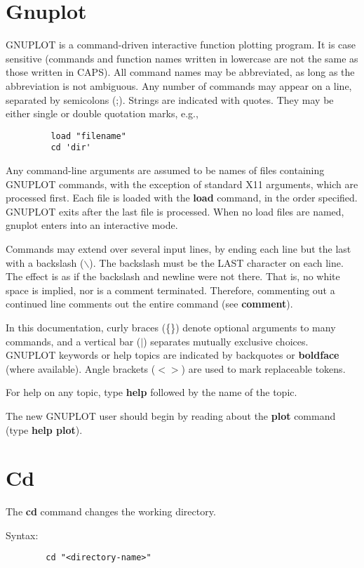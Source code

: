 
\section{Gnuplot}
GNUPLOT is a command-driven interactive function plotting program. It
is case sensitive (commands and function names written in lowercase
are not the same as those written in CAPS). All command names may be
abbreviated, as long as the abbreviation is not ambiguous. Any number
of commands may appear on a line, separated by semicolons (;).
Strings are indicated with quotes.  They may be either single or double
quotation marks, e.g.,

\begin{verbatim}
         load "filename"
         cd 'dir'
\end{verbatim}

Any command-line arguments are assumed to be names of files containing 
GNUPLOT commands, with the exception of standard X11 arguments, which
are processed first. Each file is loaded with the {\bf load} command, in the
order specified. GNUPLOT exits after the last file is processed.  When
no load files are named, gnuplot enters into an interactive mode.

Commands may extend over several input lines, by ending each 
line but the last with a backslash ($\backslash$). The backslash must be the LAST
character on each line. The effect is as if the backslash and newline
were not there. That is, no white space is implied, nor is a comment
terminated. Therefore, commenting out a continued line comments out
the entire command (see {\bf comment}).

In this documentation, curly braces (\{\}) denote optional arguments to
many commands, and a vertical bar ($|$) separates mutually exclusive
choices.  GNUPLOT keywords or help topics are indicated by backquotes
or {\bf boldface} (where available).  Angle brackets ($<$$>$) are used to mark
replaceable tokens.

For help on any topic, type {\bf help} followed by the name of the topic.

The new GNUPLOT user should begin by reading about the {\bf plot}
command (type {\bf help plot}).
\section{Cd}
The {\bf cd} command changes the working directory.

Syntax:
\begin{verbatim}
        cd "<directory-name>"
\end{verbatim}

